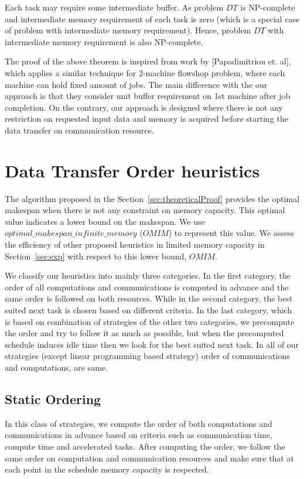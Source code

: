 \documentclass[runningheads]{llncs} %
\begin{document}
Each task may require some intermediate buffer. As problem $DT$ is NP-complete and intermediate 
memory requirement of each task is zero (which is a special case of problem with intermediate memory 
requirement). Hence, problem $DT$ with intermediate memory requirement is also NP-complete.





The proof of the above theorem is inspired from work by [Papadimitriou et. al], which applies a similar 
technique for 2-machine flowshop problem, where each machine can hold fixed amount of jobs. The 
main difference with the our approach is that they consider unit buffer requirement on 1st machine 
after job completion. On the contrary, our approach is designed where there is not any restriction on 
requested input data and memory is acquired before starting the data transfer on communication 
resource.


	
	\section{Data Transfer Order heuristics}
	\label{sec:heuristics}

The algorithm proposed in the Section~\ref{sec:theoreticalProof} provides the optimal makespan when there is not any constraint on memory capacity. This optimal value indicates a lower bound on the makespan. We use $optimal\_makespan\_infinite\_memory$ ($OMIM$) to represent this value. We assess the efficiency of other proposed heuristics in limited memory capacity in Section~\ref{sec:exp} with respect to this lower bound, $OMIM$.


We classify our heuristics into mainly three categories. In the first category, the order of all computations and communications is computed in advance and the same order is followed on both resources. While in the second category, the best suited next task is chosen based on different criteria. In the last category, which is based on combination of strategies of the other two categories, we precompute the order and try to follow it as much as possible, but when the precomputed schedule induces idle time then we look for the best suited next task. In all of our strategies (except linear programming based strategy) order of communications and computations, are same.

\subsection{Static Ordering}
In this class of strategies, we compute the order of both computations and communications in advance based on criteria such as communication time, compute time and accelerated tasks. After computing the order, we follow the same order on computation and communication resources and make sure that at each point in the schedule memory capacity is respected.
\end{document}
